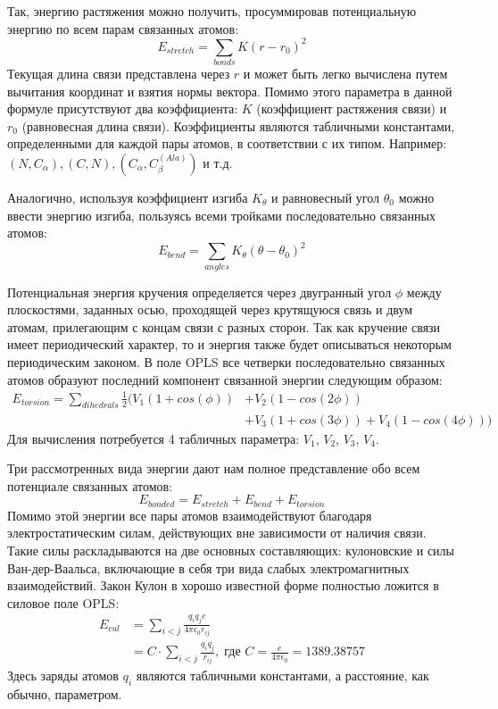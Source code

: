   Так, энергию растяжения можно получить, просуммировав потенциальную энергию по всем парам связанных атомов:
  $$
  E_{stretch} = \sum_{bonds}K(r - r_0)^2
  $$
  Текущая длина связи представлена через $r$ и может быть легко вычислена путем вычитания координат и взятия нормы вектора.
  Помимо этого параметра в данной формуле присутствуют два коэффициента: $K$ (коэффициент растяжения связи) и $r_0$ (равновесная длина связи).
  Коэффициенты являются табличными константами, определенными для каждой пары атомов, в соответствии с их типом.
  Например: $(N, C_{\alpha}), (C, N), (C_{\alpha}, C_{\beta}^{(Ala)})$ и т.д.

  Аналогично, используя коэффициент изгиба $K_{\theta}$ и равновесный угол $\theta_0$ можно ввести энергию изгиба, пользуясь всеми тройками последовательно связанных атомов:
  $$
  E_{bend} = \sum_{angles}K_{\theta}(\theta - \theta_0)^2
  $$

  Потенциальная энергия кручения определяется через двугранный угол $\phi$ между плоскостями, заданных осью, проходящей через крутящуюся связь и двум атомам, прилегающим с концам связи с разных сторон.
  Так как кручение связи имеет периодический характер, то и энергия также будет описываться некоторым периодическим законом.
  В поле OPLS все четверки последовательно связанных атомов образуют последний компонент связанной энергии следующим образом:
  $$
  \begin{aligned}
    E_{torsion} = \sum_{dihedrals}\frac{1}{2}(V_1(1 + cos(\phi)) &+ V_2(1 - cos(2\phi))\\
    &+ V_3(1 + cos(3\phi)) + V_4(1 - cos(4\phi)))
  \end{aligned}
  $$
  Для вычисления потребуется 4 табличных параметра: $V_1$, $V_2$, $V_3$, $V_4$.

  Три рассмотренных вида энергии дают нам полное представление обо всем потенциале связанных атомов:
  $$
  E_{bonded} = E_{stretch} + E_{bend} + E_{torsion}
  $$
  Помимо этой энергии все пары атомов взаимодействуют благодаря электростатическим силам, действующих вне зависимости от наличия связи.
  Такие силы раскладываются на две основных составляющих: кулоновские и силы Ван-дер-Ваальса, включающие в себя три вида слабых электромагнитных взаимодействий.
  Закон Кулон в хорошо известной форме полностью ложится в силовое поле OPLS:
  $$
  \begin{aligned}
  E_{cul} &= \sum_{i < j} \frac{q_i q_j e}{4 \pi \epsilon_0 r_{ij}} \\
         &= C \cdot \sum_{i < j} \frac{q_i q_j}{r_{ij}},\; \text{где } C = \frac{e}{4 \pi \epsilon_0} = 1389.38757  
  \end{aligned}
  $$
  Здесь заряды атомов $q_i$ являются табличными константами, а расстояние, как обычно, параметром.

